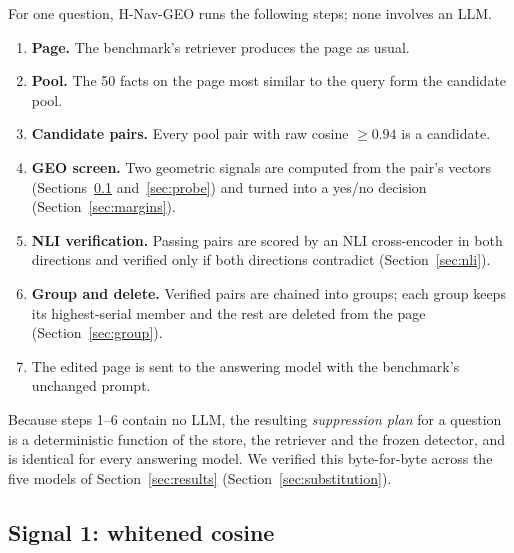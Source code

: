 \documentclass[journal=jcisd8,manuscript=article]{achemso}
\begin{document}
For one question, H-Nav-GEO runs the following steps; none involves an LLM.
\begin{enumerate}
\item \textbf{Page.} The benchmark's retriever produces the page as usual.
\item \textbf{Pool.} The 50 facts on the page most similar to the query form the candidate pool.
\item \textbf{Candidate pairs.} Every pool pair with raw cosine $\geq0.94$ is a candidate.
\item \textbf{GEO screen.} Two geometric signals are computed from the pair's vectors (Sections~\ref{sec:white} and~\ref{sec:probe}) and turned into a yes/no decision (Section~\ref{sec:margins}).
\item \textbf{NLI verification.} Passing pairs are scored by an NLI cross-encoder in both directions and verified only if both directions contradict (Section~\ref{sec:nli}).
\item \textbf{Group and delete.} Verified pairs are chained into groups; each group keeps its highest-serial member and the rest are deleted from the page (Section~\ref{sec:group}).
\item The edited page is sent to the answering model with the benchmark's unchanged prompt.
\end{enumerate}

Because steps 1--6 contain no LLM, the resulting \emph{suppression plan} for a question is a deterministic function of the store, the retriever and the frozen detector, and is identical for every answering model. We verified this byte-for-byte across the five models of Section~\ref{sec:results} (Section~\ref{sec:substitution}).


\subsection{Signal 1: whitened cosine}
\label{sec:white}
\end{document}
